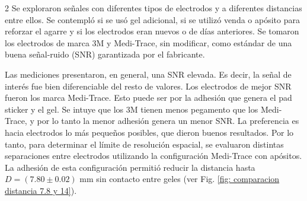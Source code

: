 \documentclass[11pt,letterpaper]{article}
\begin{document}
\begin{multicols*}{2}
Se exploraron señales con diferentes tipos de electrodos y a diferentes distancias entre ellos.
Se contempló  si se usó gel adicional, si se utilizó venda o apósito para reforzar el agarre y si los electrodos eran nuevos o de días anteriores. Se tomaron los electrodos de marca 3M y Medi-Trace, sin modificar, como estándar de una buena señal-ruido (SNR) garantizada por el fabricante.

Las mediciones presentaron, en general, una SNR elevada. Es decir, la señal de interés fue bien diferenciable del resto de valores. Los electrodos de mejor SNR fueron los marca Medi-Trace. Esto puede ser por la adhesión que genera el pad sticker y el gel. %
Se intuye que los 3M tienen menos pegamento que los Medi-Trace, y por lo tanto la menor adhesión genera un menor SNR. La preferencia es hacia electrodos lo más pequeños posibles, que dieron buenos resultados. Por lo tanto, para determinar el límite de resolución espacial, se evaluaron distintas separaciones entre electrodos utilizando la configuración Medi-Trace con apósitos. La adhesión de esta configuración permitió reducir la distancia hasta $D=(7.80\pm0.02)$ mm sin contacto entre geles (ver Fig. \ref{fig: comparacion distancia 7.8 y 14}).


\end{multicols*}
\end{document}
